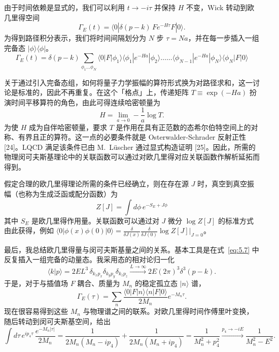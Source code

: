由于时间依赖是显式的，我们可以利用 $t \to -i\tau$ 并保持 $H$ 不变，Wick 转动到欧几里得空间
\begin{equation}
\Gamma_E(t) = \langle 0| \delta(p-k)\, F e^{-H\tau} F |0\rangle .
\label{eq:5.6}
\end{equation}
为得到路径积分表示，我们将时间间隔划分为 $N$ 步 $\tau = Na$，并在每一步插入一组完备态 $|\phi\rangle\langle\phi|$。
\begin{equation}
\Gamma_E(t) = \delta(p-k) \sum_{\phi_1 \ldots \phi_N} \langle 0|F|\phi_1\rangle \langle \phi_1| e^{-Ha} |\phi_2\rangle \ldots \ldots \langle \phi_{N-1}| e^{-Ha} |\phi_N\rangle \langle \phi_N| F |0\rangle
\label{eq:5.7}
\end{equation}

关于通过引入完备态组，如何将量子力学振幅的算符形式换为对路径求和，这一讨论是标准的，因此不再重复。在这个「格点」上，传递矩阵 $T \equiv \exp(-Ha)$ 扮演时间平移算符的角色，由此可得连续哈密顿量为
\begin{equation}
H = \lim_{a\to 0} -\frac{1}{a} \log T .
\label{eq:5.8}
\end{equation}
为使 $H$ 成为自伴哈密顿量，要求 $T$ 是作用在具有正范数的态希尔伯特空间上的对称、有界且正的算符。这一点的必要条件就是 Osterwalder-Schrader 反射正性 [24]。LQCD 满足该条件已由 M.~L\"uscher 通过显式构造证明 [25]。因此，所需的物理闵可夫斯基理论中的关联函数可以通过对欧几里得对应关联函数作解析延拓而得到。

假定合理的欧几里得理论所需的条件已经确立，则在存在源 $J$ 时，真空到真空振幅（也称为生成泛函或配分函数）为
\begin{equation}
Z[J] = \int d\phi\, e^{-S_E + J\phi}
\label{eq:5.9}
\end{equation}
其中 $S_E$ 是欧几里得作用量。关联函数可以通过对 $J$ 微分 $\log Z[J]$ 的标准方式由此获得，例如 $\langle 0|\phi(x)\phi(0)|0\rangle = \frac{\delta}{\delta J(x)} \frac{\delta}{\delta J(0)} \log Z[J]\big|_{J=0}$。

最后，我总结欧几里得量与闵可夫斯基量之间的关系。基本工具是在式~\eqref{eq:5.7} 中反复插入一组完备的动量态。我采用态的相对论归一化
\begin{equation}
\langle k|p\rangle = 2E L^3\, \delta_{k_x p_x} \delta_{k_y p_y} \delta_{k_z p_z} \xrightarrow{L\to\infty} 2E(2\pi)^3 \delta^3(p-k) .
\label{eq:5.10}
\end{equation}
于是，对于与插值场 $F$ 耦合、质量为 $M_n$ 的稳定孤立态 $|n\rangle$ 谱，
\begin{equation}
\Gamma_E(\tau) = \sum_n \frac{\langle 0|F|n\rangle \langle n|F|0\rangle}{2M_n} e^{-M_n \tau} .
\label{eq:5.11}
\end{equation}
现在很容易得到这些 $M_n$ 与物理谱之间的联系。对欧几里得时间作傅里叶变换，随后转动到闵可夫斯基空间，给出
\begin{equation}
\int d\tau\, e^{ip_4 \tau}\, \frac{e^{-M_n |\tau|}}{2M_n}
= \frac{1}{2M_n (M_n - ip_4)} + \frac{1}{2M_n (M_n + ip_4)}
= \frac{1}{M_n^2 + p_4^2}
\xrightarrow{p_4 \to -iE} \frac{1}{M_n^2 - E^2} .
\label{eq:5.12}
\end{equation}

